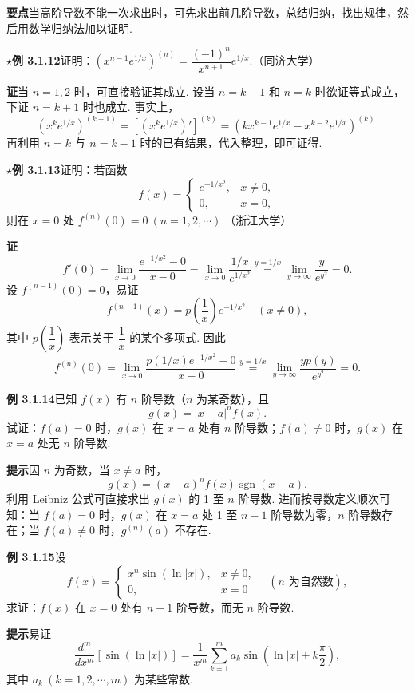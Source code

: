 \documentclass[UTF8,12pt,a4paper,fontset=fandol]{ctexart}
\begin{document}
\noindent\textbf{要点}\quad 当高阶导数不能一次求出时，可先求出前几阶导数，总结归纳，找出规律，然后用数学归纳法加以证明.

\noindent\textbf{$\star$例 3.1.12}\quad 证明：$\left(x^{n-1}e^{1/x}\right)^{(n)}=\dfrac{(-1)^n}{x^{n+1}}e^{1/x}$.（同济大学）

\noindent\textbf{证}\quad 当 $n=1,2$ 时，可直接验证其成立. 设当 $n=k-1$ 和 $n=k$ 时欲证等式成立，下证 $n=k+1$ 时也成立. 事实上，
\[
  \left(x^k e^{1/x}\right)^{(k+1)}
  =\left[(x^k e^{1/x})'\right]^{(k)}
  =\left(kx^{k-1}e^{1/x}-x^{k-2}e^{1/x}\right)^{(k)}.
\]
再利用 $n=k$ 与 $n=k-1$ 时的已有结果，代入整理，即可证得.

\noindent\textbf{$\star$例 3.1.13}\quad 证明：若函数
\[
f(x)=
\begin{cases}
e^{-1/x^2}, & x\ne0,\\
0, & x=0,
\end{cases}
\]
则在 $x=0$ 处 $f^{(n)}(0)=0\ (n=1,2,\cdots)$.（浙江大学）

\noindent\textbf{证}\quad
\[
  f'(0)=\lim_{x\to0}\frac{e^{-1/x^2}-0}{x-0}
  =\lim_{x\to0}\frac{1/x}{e^{1/x^2}}
  \stackrel{y=1/x}{=}\lim_{y\to\infty}\frac{y}{e^{y^2}}=0.
\]
设 $f^{(n-1)}(0)=0$，易证
\[
  f^{(n-1)}(x)=p\left(\frac1x\right)e^{-1/x^2}\quad(x\ne0),
\]
其中 $p\left(\dfrac1x\right)$ 表示关于 $\dfrac1x$ 的某个多项式. 因此
\[
  f^{(n)}(0)=\lim_{x\to0}\frac{p(1/x)e^{-1/x^2}-0}{x-0}
  \stackrel{y=1/x}{=}\lim_{y\to\infty}\frac{yp(y)}{e^{y^2}}=0.
\]

\noindent\textbf{例 3.1.14}\quad 已知 $f(x)$ 有 $n$ 阶导数（$n$ 为某奇数），且
\[
  g(x)=|x-a|^n f(x).
\]
试证：$f(a)=0$ 时，$g(x)$ 在 $x=a$ 处有 $n$ 阶导数；$f(a)\ne0$ 时，$g(x)$ 在 $x=a$ 处无 $n$ 阶导数.

\noindent\textbf{提示}\quad 因 $n$ 为奇数，当 $x\ne a$ 时，
\[
  g(x)=(x-a)^n f(x)\operatorname{sgn}(x-a).
\]
利用 Leibniz 公式可直接求出 $g(x)$ 的 1 至 $n$ 阶导数. 进而按导数定义顺次可知：当 $f(a)=0$ 时，$g(x)$ 在 $x=a$ 处 1 至 $n-1$ 阶导数为零，$n$ 阶导数存在；当 $f(a)\ne0$ 时，$g^{(n)}(a)$ 不存在.

\noindent\textbf{例 3.1.15}\quad 设
\[
f(x)=
\begin{cases}
x^n\sin(\ln|x|), & x\ne0,\\
0, & x=0
\end{cases}
\quad(n\text{ 为自然数}),
\]
求证：$f(x)$ 在 $x=0$ 处有 $n-1$ 阶导数，而无 $n$ 阶导数.

\noindent\textbf{提示}\quad 易证
\[
  \frac{d^m}{dx^m}[\sin(\ln|x|)]
  =\frac1{x^m}\sum_{k=1}^m a_k\sin\left(\ln|x|+k\frac\pi2\right),
\]
其中 $a_k\ (k=1,2,\cdots,m)$ 为某些常数.
\end{document}
